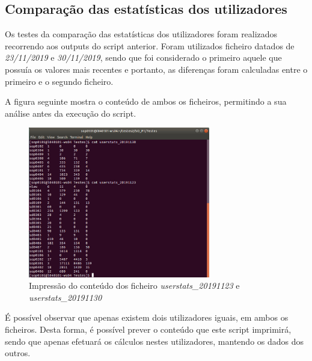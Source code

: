\documentclass[10pt,portuguese]{article}
\begin{document}
\subsection{Comparação das estatísticas dos utilizadores}
Os testes da comparação das estatísticas dos utilizadores foram realizados recorrendo aos outputs do script anterior. Foram utilizados ficheiro datados de \textit{23/11/2019} e \textit{30/11/2019}, sendo que foi considerado o primeiro aquele que possuía os valores mais recentes e portanto, as diferenças foram calculadas entre o primeiro e o segundo ficheiro.
\par A figura seguinte mostra o conteúdo de ambos os ficheiros, permitindo a sua análise antes da execução do script.
\begin{figure}[!h]
    \centering
    \includegraphics[width=300]{Resultados/cat_compare.jpeg}
    \caption{Impressão do conteúdo dos ficheiro \textit{userstats\_20191123} e \textit{userstats\_20191130}}
\end{figure}
\par É possível observar que apenas existem dois utilizadores iguais, em ambos os ficheiros. Desta forma, é possível prever o conteúdo que este script imprimirá, sendo que apenas efetuará os cálculos nestes utilizadores, mantendo os dados dos outros.
\end{document}
